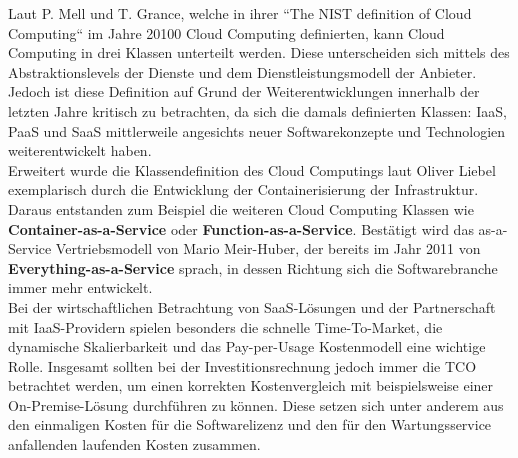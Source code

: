 Laut P. Mell und T. Grance, welche in ihrer ``The NIST definition of Cloud Computing`` im Jahre 20100 Cloud Computing definierten, kann Cloud Computing in drei Klassen unterteilt werden. Diese unterscheiden sich mittels des Abstraktionslevels der Dienste und dem Dienstleistungsmodell der Anbieter.\autocite[Vgl.][S. 2-3]{Mell.2011}\\
Jedoch ist diese Definition auf Grund der Weiterentwicklungen innerhalb der letzten Jahre kritisch zu betrachten, da sich die damals definierten Klassen: \ac{IaaS}, \ac{PaaS} und \ac{SaaS} mittlerweile angesichts neuer Softwarekonzepte und Technologien weiterentwickelt haben.\\
Erweitert wurde die Klassendefinition des Cloud Computings laut Oliver Liebel exemplarisch durch die Entwicklung der Containerisierung der Infrastruktur. Daraus entstanden zum Beispiel die weiteren Cloud Computing Klassen wie \textbf{Container-as-a-Service} oder \textbf{Function-as-a-Service}.\autocite[Vgl.][S. 55-56]{Liebel.2019} Bestätigt wird das as-a-Service Vertriebsmodell von Mario Meir-Huber, der bereits im Jahr 2011 von \textbf{Everything-as-a-Service} sprach, in dessen Richtung sich die Softwarebranche immer mehr entwickelt. \autocite[Vgl.][S. 32]{MeirHuber.2011}\\
Bei der wirtschaftlichen Betrachtung von \ac{SaaS}-Lösungen und der Partnerschaft mit \ac{IaaS}-Providern spielen besonders die schnelle Time-To-Market, die dynamische Skalierbarkeit und das Pay-per-Usage Kostenmodell eine wichtige Rolle. Insgesamt sollten bei der Investitionsrechnung jedoch immer die \ac{TCO} betrachtet werden, um einen korrekten Kostenvergleich mit beispielsweise einer On-Premise-Lösung durchführen zu können. Diese setzen sich unter anderem aus den einmaligen Kosten für die Softwarelizenz und den für den Wartungsservice anfallenden laufenden Kosten zusammen. \autocite[Vgl.][S. 63-66]{Metzger.2011}

